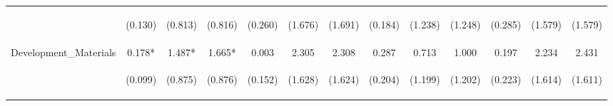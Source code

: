 \begin{tabular}{lcccccccccccc}
 & \begin{footnotesize}(0.130)\end{footnotesize} & \begin{footnotesize}(0.813)\end{footnotesize} & \begin{footnotesize}(0.816)\end{footnotesize} & \begin{footnotesize}(0.260)\end{footnotesize} & \begin{footnotesize}(1.676)\end{footnotesize} & \begin{footnotesize}(1.691)\end{footnotesize} & \begin{footnotesize}(0.184)\end{footnotesize} & \begin{footnotesize}(1.238)\end{footnotesize} & \begin{footnotesize}(1.248)\end{footnotesize} & \begin{footnotesize}(0.285)\end{footnotesize} & \begin{footnotesize}(1.579)\end{footnotesize} & \begin{footnotesize}(1.579)\end{footnotesize}\\
\noalign{\smallskip}Development_Materials & 0.178* & 1.487* & 1.665* & 0.003 & 2.305 & 2.308 & 0.287 & 0.713 & 1.000 & 0.197 & 2.234 & 2.431\\
 & \begin{footnotesize}(0.099)\end{footnotesize} & \begin{footnotesize}(0.875)\end{footnotesize} & \begin{footnotesize}(0.876)\end{footnotesize} & \begin{footnotesize}(0.152)\end{footnotesize} & \begin{footnotesize}(1.628)\end{footnotesize} & \begin{footnotesize}(1.624)\end{footnotesize} & \begin{footnotesize}(0.204)\end{footnotesize} & \begin{footnotesize}(1.199)\end{footnotesize} & \begin{footnotesize}(1.202)\end{footnotesize} & \begin{footnotesize}(0.223)\end{footnotesize} & \begin{footnotesize}(1.614)\end{footnotesize} & \begin{footnotesize}(1.611)\end{footnotesize}\\

\end{tabular}

